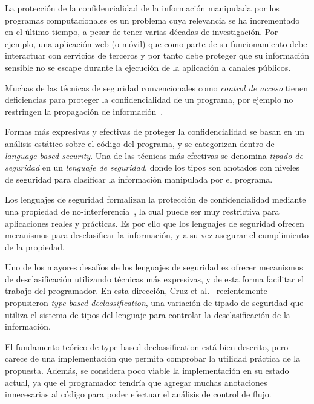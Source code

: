 \begin{intro}

	La protección de la confidencialidad de la información manipulada por los programas computacionales es un problema cuya relevancia se ha incrementado en el último tiempo, a pesar de tener varias décadas de investigación. Por ejemplo, una aplicación web (o móvil) que como parte de su funcionamiento debe interactuar con servicios de terceros y por tanto debe proteger que su información sensible no se escape durante la ejecución de la aplicación a canales públicos.

	Muchas de las técnicas de seguridad convencionales como \textit{control de acceso} tienen deficiencias para proteger la confidencialidad de un programa, por ejemplo no restringen la propagación de información~\cite{myers-phd}.

	Formas más expresivas y efectivas de proteger la confidencialidad se basan en un análisis estático sobre el código del programa, y se categorizan dentro de \textit{language-based security}. Una de las técnicas más efectivas se denomina \textit{tipado de seguridad} en un \textit{lenguaje de seguridad}, donde los tipos son anotados con niveles de seguridad para clasificar la información manipulada por el programa.

	Los lenguajes de seguridad formalizan la protección de confidencialidad mediante una propiedad de no-interferencia~\cite{noninterference}, la cual puede ser muy restrictiva para aplicaciones reales y prácticas. Es por ello que los lenguajes de seguridad ofrecen mecanismos para desclasificar la información, y a su vez asegurar el cumplimiento de la propiedad.

	Uno de los mayores desafíos de los lenguajes de seguridad es ofrecer mecanismos de desclasificación utilizando técnicas más expresivas, y de esta forma facilitar el trabajo del programador. En esta dirección, Cruz et al.~\cite{cruzAl:ecoop2017} recientemente propusieron \emph{type-based declassification}, una variación de tipado de seguridad que utiliza el sistema de tipos del lenguaje para controlar la desclasificación de la información.

	El fundamento teórico de type-based declassification está bien descrito, pero carece de una implementación que permita comprobar la utilidad práctica de la propuesta. Además, se considera poco viable la implementación en su estado actual, ya que el programador tendría que agregar muchas anotaciones innecesarias al código para poder efectuar el análisis de control de flujo.


\end{intro}
